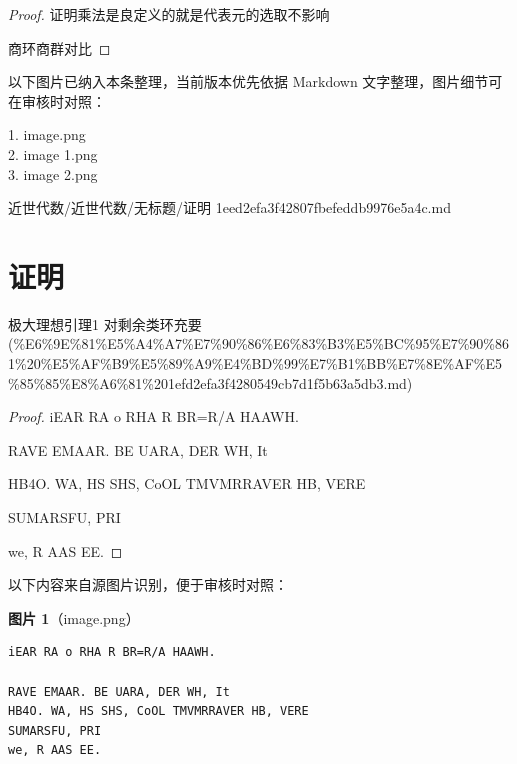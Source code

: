 \begin{proof}

证明乘法是良定义的就是代表元的选取不影响

商环商群对比

\end{proof}

\begin{note}[关联图片]
以下图片已纳入本条整理，当前版本优先依据 Markdown 文字整理，图片细节可在审核时对照：

1. image.png\\
2. image 1.png\\
3. image 2.png\\

\end{note}

\begin{note}[来源路径]

近世代数/近世代数/无标题/证明 1eed2efa3f42807fbefeddb9976e5a4c.md

\end{note}

\section*{证明}

\begin{note}[来源上级主题]

极大理想引理1 对剩余类环充要 (\%E6\%9E\%81\%E5\%A4\%A7\%E7\%90\%86\%E6\%83\%B3\%E5\%BC\%95\%E7\%90\%861\%20\%E5\%AF\%B9\%E5\%89\%A9\%E4\%BD\%99\%E7\%B1\%BB\%E7\%8E\%AF\%E5\%85\%85\%E8\%A6\%81\%201efd2efa3f4280549cb7d1f5b63a5db3.md)

\end{note}

\begin{proof}

iEAR RA o RHA R BR=R/A HAAWH.

RAVE EMAAR. BE UARA, DER WH, It

HB4O. WA, HS SHS, CoOL TMVMRRAVER HB, VERE

SUMARSFU, PRI

we, R AAS EE.

\end{proof}

\begin{note}
以下内容来自源图片识别，便于审核时对照：

\textbf{图片 1}（image.png）
\begin{Verbatim}[fontsize=\small]
iEAR RA o RHA R BR=R/A HAAWH.

RAVE EMAAR. BE UARA, DER WH, It
HB4O. WA, HS SHS, CoOL TMVMRRAVER HB, VERE
SUMARSFU, PRI
we, R AAS EE.
\end{Verbatim}

\end{note}

